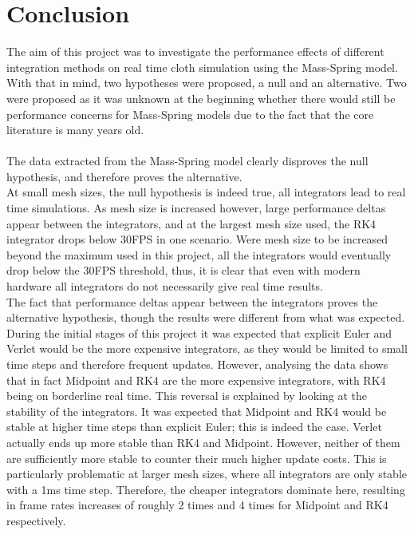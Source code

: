 \chapter{Conclusion}

The aim of this project was to investigate the performance effects of different integration methods on real time cloth simulation using the Mass-Spring model. With that in mind, two hypotheses were proposed, a null and an alternative. Two were proposed as it was unknown at the beginning whether there would still be performance concerns for Mass-Spring models due to the fact that the core literature is many years old.
\\\\The data extracted from the Mass-Spring model clearly disproves the null hypothesis, and therefore proves the alternative.
\\At small mesh sizes, the null hypothesis is indeed true, all integrators lead to real time simulations. As mesh size is increased however, large performance deltas appear between the integrators, and at the largest mesh size used, the RK4 integrator drops below 30FPS in one scenario. Were mesh size to be increased beyond the maximum used in this project, all the integrators would eventually drop below the 30FPS threshold, thus, it is clear that even with modern hardware all integrators do not necessarily give real time results. 
\\The fact that performance deltas appear between the integrators proves the alternative hypothesis, though the results were different from what was expected. During the initial stages of this project it was expected that explicit Euler and Verlet would be the more expensive integrators, as they would be limited to small time steps and therefore frequent updates. However, analysing the data shows that in fact Midpoint and RK4 are the more expensive integrators, with RK4 being on borderline real time. This reversal is explained by looking at the stability of the integrators. It was expected that Midpoint and RK4 would be stable at higher time steps than explicit Euler; this is indeed the case. Verlet actually ends up more stable than RK4 and Midpoint. However, neither of them are sufficiently more stable to counter their much higher update costs. This is particularly problematic at larger mesh sizes, where all integrators are only stable with a 1ms time step. Therefore, the cheaper integrators dominate here, resulting in frame rates increases of roughly 2 times and 4 times for Midpoint and RK4 respectively.
